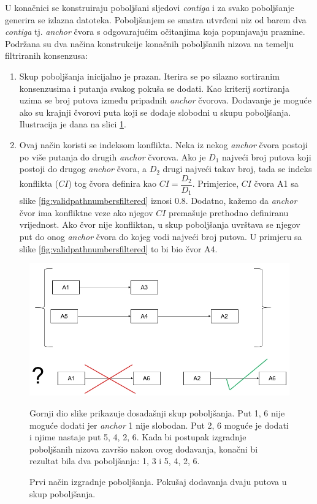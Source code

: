 \documentclass[times, utf8, seminar, numeric]{fer}
\begin{document}
U konačnici se konstruiraju poboljšani sljedovi \textit{contiga} i za svako poboljšanje generira se izlazna datoteka. Poboljšanjem se smatra utvrđeni niz od barem dva \textit{contiga} tj. \textit{anchor} čvora s odgovarajućim očitanjima koja popunjavaju praznine. Podržana su dva načina konstrukcije konačnih poboljšanih nizova na temelju filtriranih konsenzusa:

\begin{enumerate}
	\item Skup poboljšanja inicijalno je prazan. Iterira se po silazno sortiranim konsenzusima i putanja svakog pokuša se dodati. Kao kriterij sortiranja uzima se broj putova između pripadnih \textit{anchor} čvorova. Dodavanje je moguće ako su krajnji čvorovi puta koji se dodaje slobodni u skupu poboljšanja. Ilustracija je dana na slici \ref{fig:addpath}.
	\item Ovaj način koristi se indeksom konflikta. Neka iz nekog \textit{anchor} čvora postoji po više putanja do drugih \textit{anchor} čvorova. Ako je $D_1$ najveći broj putova koji postoji do drugog \textit{anchor} čvora, a $D_2$ drugi najveći takav broj, tada se indeks konflikta ($CI$) tog čvora definira kao $CI = \dfrac{D_2}{D_1}$. Primjerice, $CI$ čvora A1 sa slike \ref{fig:validpathnumbersfiltered} iznosi 0.8. Dodatno, kažemo da \textit{anchor} čvor ima konfliktne veze ako njegov $CI$ premašuje prethodno definiranu vrijednost. Ako čvor nije konfliktan, u skup poboljšanja uvrštava se njegov put do onog \textit{anchor} čvora do kojeg vodi najveći broj putova. U primjeru sa slike \ref{fig:validpathnumbersfiltered} to bi bio čvor A4.
\end{enumerate}

\begin{figure}[h]
	\centering
	\includegraphics[width=0.9\linewidth]{img/add_path}
	\caption{Prvi način izgradnje poboljšanja. Pokušaj dodavanja dvaju putova u skup poboljšanja.}
	\label{fig:addpath}
	\small
	Gornji dio slike prikazuje dosadašnji skup poboljšanja. Put 1, 6 nije moguće dodati jer \textit{anchor} 1 nije slobodan. Put 2, 6 moguće je dodati i njime nastaje put 5, 4, 2, 6. Kada bi postupak izgradnje poboljšanih nizova završio nakon ovog dodavanja, konačni bi rezultat bila dva poboljšanja: 1, 3 i 5, 4, 2, 6.
\end{figure}
\end{document}
